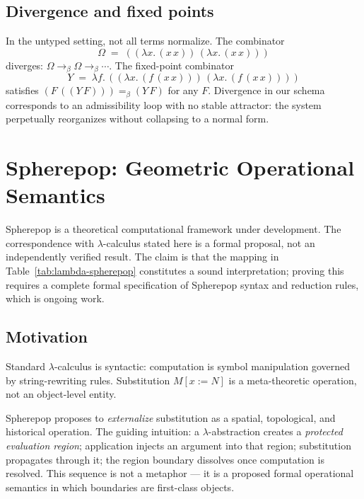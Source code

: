 \documentclass[12pt, a4paper]{article}
\theoremstyle{plain}
\theoremstyle{definition}
\theoremstyle{remark}
\newcommand{\betal}{\to_{\beta}}
\newcommand{\Lam}[2]{\lambda #1.\, #2}
\newcommand{\App}[2]{(#1\, #2)}
\newcommand{\subst}[3]{#1[#2 \mathrel{:=} #3]}
\begin{document}
\subsection{Divergence and fixed points}

In the untyped setting, not all terms normalize.
The combinator
\[
  \Omega \;=\; \App{(\Lam{x}{\App{x}{x}})}{(\Lam{x}{\App{x}{x}})}
\]
diverges: $\Omega \betal \Omega \betal \cdots$.
The fixed-point combinator
\[
  Y \;=\; \Lam{f}{\App{(\Lam{x}{\App{f}{\App{x}{x}}})}{(\Lam{x}{\App{f}{\App{x}{x}}})}}
\]
satisfies $\App{F}{(\App{Y}{F})} =_\beta \App{Y}{F}$ for any $F$.
Divergence in our schema corresponds to an admissibility loop with no
stable attractor: the system perpetually reorganizes without collapsing
to a normal form.

\section{Spherepop: Geometric Operational Semantics}
\label{sec:spherepop}

\begin{speculative}
  Spherepop is a theoretical computational framework under development.
  The correspondence with $\lambda$-calculus stated here is a formal
  proposal, not an independently verified result.
  The claim is that the mapping in Table~\ref{tab:lambda-spherepop}
  constitutes a sound interpretation; proving this requires a complete
  formal specification of Spherepop syntax and reduction rules,
  which is ongoing work.
\end{speculative}

\subsection{Motivation}

Standard $\lambda$-calculus is syntactic: computation is symbol
manipulation governed by string-rewriting rules.
Substitution $\subst{M}{x}{N}$ is a meta-theoretic operation,
not an object-level entity.

Spherepop proposes to \emph{externalize} substitution as a spatial,
topological, and historical operation.
The guiding intuition: a $\lambda$-abstraction creates a
\emph{protected evaluation region}; application injects an argument
into that region; substitution propagates through it;
the region boundary dissolves once computation is resolved.
This sequence is not a metaphor — it is a proposed formal
operational semantics in which boundaries are first-class objects.
\end{document}
